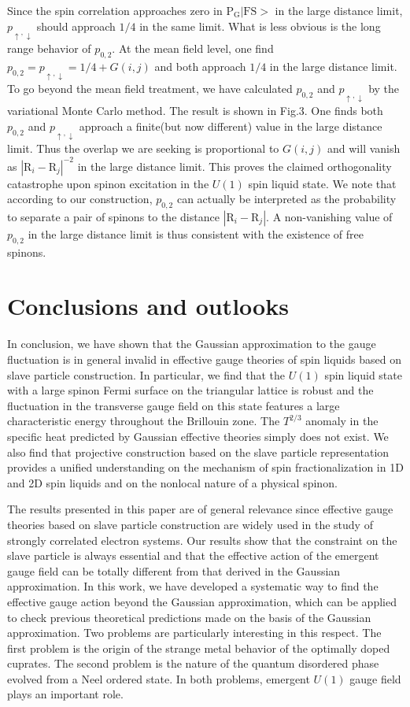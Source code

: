 \documentclass[12pt]{article}
\begin{document}
Since the spin correlation approaches zero in $\mathrm{P_{G}}|\mathrm{FS}>$ in the large distance limit, $p_{\uparrow,\downarrow}$ should approach $1/4$ in the same limit. What is less obvious is the long range behavior of $p_{0,2}$. At the mean field level, one find $p_{0,2}=p_{\uparrow,\downarrow}=1/4+G(i,j)$ and both approach $1/4$ in the large distance limit. To go beyond the mean field treatment, we have calculated $p_{0,2}$ and $p_{\uparrow,\downarrow}$ by the variational Monte Carlo method. The result is shown in Fig.3. One finds both $p_{0,2}$ and $p_{\uparrow,\downarrow}$ approach a finite(but now different) value in the large distance limit. Thus the overlap we are seeking is proportional to $G(i,j)$ and will vanish as $|\mathrm{R}_{i}-\mathrm{R}_{j}|^{-2}$ in the large distance limit. This proves the claimed orthogonality catastrophe upon spinon excitation in the $U(1)$ spin liquid state. We note that according to our construction, $p_{0,2}$ can actually be interpreted as the probability to separate a pair of spinons to the distance $|\mathrm{R}_{i}-\mathrm{R}_{j}|$. A non-vanishing value of $p_{0,2}$ in the large distance limit is thus consistent with the existence of free spinons.

\section*{Conclusions and outlooks}
In conclusion, we have shown that the Gaussian approximation to the gauge fluctuation is in general invalid in effective gauge theories of spin liquids based on slave particle construction. In particular, we find that the $U(1)$ spin liquid state with a large spinon Fermi surface on the triangular lattice is robust and the fluctuation in the transverse gauge field on this state features a large characteristic energy throughout the Brillouin zone. The $T^{2/3}$ anomaly in the specific heat predicted by Gaussian effective theories simply does not exist.  We also find that projective construction based on the slave particle representation provides a unified understanding on the mechanism of spin fractionalization in 1D and 2D spin liquids and on the nonlocal nature of a physical spinon. 

The results presented in this paper are of general relevance since effective gauge theories based on slave particle construction are widely used in the study of strongly correlated electron systems. Our results show that the constraint on the slave particle is always essential and that the effective action of the emergent gauge field can be totally different from that derived in the Gaussian approximation. In this work, we have developed a systematic way to find the effective gauge action beyond the Gaussian approximation, which can be applied to check previous theoretical predictions made on the basis of the Gaussian approximation. Two problems are particularly interesting in this respect. The first problem is the origin of the strange metal behavior of the optimally doped cuprates\cite{PALee2}. The second problem is the nature of the quantum disordered phase evolved from a Neel ordered state\cite{Read}. In both problems, emergent $U(1)$ gauge field plays an important role. 
\end{document}

